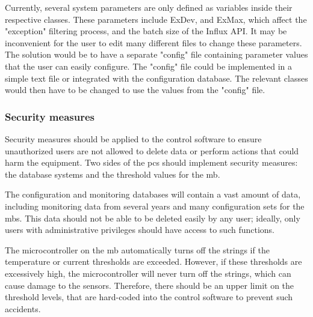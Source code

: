 \documentclass[main.tex]{subfiles}
\begin{document}
Currently, several system parameters are only defined as variables inside their respective classes. These parameters include ExDev, and ExMax, which affect the "exception" filtering process, and the batch size of the Influx API. It may be inconvenient for the user to edit many different files to change these parameters. The solution would be to have a separate "config" file containing parameter values that the user can easily configure. The "config" file could be implemented in a simple text file or integrated with the configuration database. The relevant classes would then have to be changed to use the values from the "config" file.

\subsubsection{Security measures}

Security measures should be applied to the control software to ensure unauthorized users are not allowed to delete data or perform actions that could harm the equipment. Two sides of the \gls{pcs} should implement security measures: the database systems and the threshold values for the \gls{mb}.

The configuration and monitoring databases will contain a vast amount of data, including monitoring data from several years and many configuration sets for the \gls{mb}s. This data should not be able to be deleted easily by any user; ideally, only users with administrative privileges should have access to such functions.

The microcontroller on the \gls{mb} automatically turns off the strings if the temperature or current thresholds are exceeded. However, if these thresholds are excessively high, the microcontroller will never turn off the strings, which can cause damage to the sensors. Therefore, there should be an upper limit on the threshold levels, that are hard-coded into the control software to prevent such accidents. 

 
\end{document}
